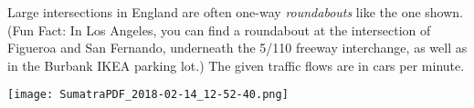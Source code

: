 \documentclass[11pt, letterpaper]{exam}
\begin{document}
\begin{questions}
\newpage
\begin{q}{12} %
	Large intersections in England are often one-way \emph{roundabouts} like the one shown. (Fun Fact: In Los Angeles, you can find a roundabout at the intersection of Figueroa and San Fernando, underneath the 5/110 freeway interchange, as well as in the Burbank IKEA parking lot.) The given traffic flows are in cars per minute.
	\texttt{[image: SumatraPDF\_2018-02-14\_12-52-40.png]}
\end{q}

\end{questions}
\end{document}

